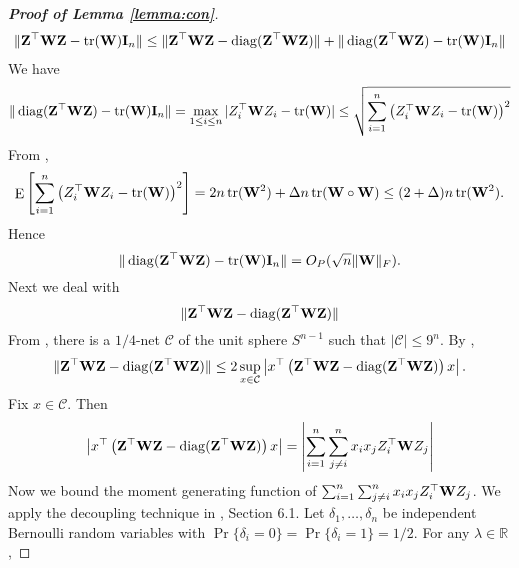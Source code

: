\documentclass[11pt]{article}
\DeclareMathOperator{\mytr}{tr}
\DeclareMathOperator{\mydiag}{diag}
\DeclareMathOperator{\myE}{E}
\theoremstyle{plain}
\theoremstyle{definition}
\theoremstyle{remark}
\begin{document}
\begin{appendices}
\begin{proof}[\textbf{Proof of Lemma \ref{lemma:con}}]
\begin{equation*}
    \begin{split}
    \|\BZ^\top \BW \BZ -\mytr (\BW) \BI_n\| 
    \leq
    \|\BZ^\top \BW \BZ - \mydiag(\BZ^\top \BW \BZ)\| 
    + 
    \| \mydiag(\BZ^\top \BW \BZ) -\mytr (\BW) \BI_n\| 
    \end{split}
\end{equation*}
We have
\begin{equation*}
    \| \mydiag(\BZ^\top \BW \BZ) -\mytr (\BW) \BI_n\| 
    =
    \max_{1\leq i\leq n}
    |Z_i^\top \BW Z_i- \mytr (\BW)|
    \leq
    \sqrt{
\sum_{i=1}^{ n}
\left(Z_i^\top \BW Z_i- \mytr (\BW)\right)^2
}
\end{equation*}
From \cite[Proposition A.1]{chen2010tests},
\begin{equation*}
    \myE \left[\sum_{i=1}^n \left(Z_i^\top \BW Z_i- \mytr (\BW)\right)^2\right]
    =2n \mytr(\BW^2) + \Delta n \mytr(\BW\circ\BW)
    \leq (2+\Delta) n \mytr(\BW^2).
\end{equation*}
Hence
\begin{equation*}
    \| \mydiag(\BZ^\top \BW \BZ) -\mytr (\BW) \BI_n\| 
    =O_P(\sqrt n \|\BW\|_F).
\end{equation*}
Next we deal with
\begin{equation*}
    \|\BZ^\top \BW \BZ - \mydiag(\BZ^\top \BW \BZ)\| 
\end{equation*}
From \cite[Lemma 5.2]{Roman2018}, there is a $1/4$-net $\mathcal C$ of the unit sphere $S^{n-1}$ such that $|\mathcal C|\leq 9^n$.
By \cite[Exercise 4.4.3]{Roman2018}, 
\begin{equation*}
    \|\BZ^\top \BW \BZ - \mydiag(\BZ^\top \BW \BZ)\|\leq 2 \sup_{x\in\mathcal C} \left|x^\top \left(\BZ^\top \BW \BZ - \mydiag(\BZ^\top \BW \BZ) \right) x\right|.
\end{equation*}
Fix $x\in \mathcal C$.
Then
\begin{equation*}
 \left|x^\top \left(\BZ^\top \BW \BZ - \mydiag(\BZ^\top \BW \BZ) \right) x\right|
 =
 \left|
 \sum_{i=1}^{n} \sum_{j\neq i}^n
 x_i x_j Z_i^\top \BW Z_j  
 \right|
\end{equation*}
Now we bound the moment generating function of $\sum_{i=1}^{n} \sum_{j\neq i}^n
 x_i x_j Z_i^\top \mathbf{W} Z_j$.
 We apply the decoupling technique in \cite{Roman2018}, Section 6.1.
 Let $\delta_1,\ldots,\delta_n$ be independent Bernoulli random variables with $\Pr\{\delta_i=0\}=\Pr\{\delta_i=1\}=1/2$.
For any $\lambda \in \mathbb R$,

\end{proof}
\end{appendices}
\end{document}
